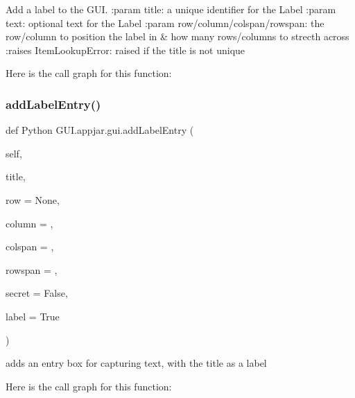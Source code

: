 \begin{DoxyVerb}Add a label to the GUI.
:param title: a unique identifier for the Label
:param text: optional text for the Label
:param row/column/colspan/rowspan: the row/column to position the label in & how many rows/columns to strecth across
:raises ItemLookupError: raised if the title is not unique
\end{DoxyVerb}
 Here is the call graph for this function\+:
\mbox{\label{class_python_01_g_u_i_1_1appjar_1_1gui_a3085fbd524cef94d4942578afbdb3ca2}} 
\subsubsection{\texorpdfstring{add\+Label\+Entry()}{addLabelEntry()}}
{\footnotesize\ttfamily def Python G\+U\+I.\+appjar.\+gui.\+add\+Label\+Entry (\begin{DoxyParamCaption}\item[{}]{self,  }\item[{}]{title,  }\item[{}]{row = {\ttfamily None},  }\item[{}]{column = {},  }\item[{}]{colspan = {},  }\item[{}]{rowspan = {},  }\item[{}]{secret = {\ttfamily False},  }\item[{}]{label = {\ttfamily True} }\end{DoxyParamCaption})}

\begin{DoxyVerb}adds an entry box for capturing text, with the title as a label \end{DoxyVerb}
 Here is the call graph for this function\+:
\mbox{\label{class_python_01_g_u_i_1_1appjar_1_1gui_a17b754ca524c253db8b281dd1a8f0b34}} 
